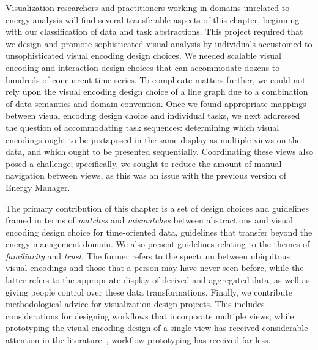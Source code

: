 Visualization researchers and practitioners working in domains unrelated to energy analysis will find several transferable aspects of this chapter, beginning with our classification of data and task abstractions.
This project required that we design and promote sophisticated visual analysis by individuals accustomed to unsophisticated visual encoding design choices.
We needed scalable visual encoding and interaction design choices that can accommodate dozens to hundreds of concurrent time series.
To complicate matters further, we could not rely upon the visual encoding design choice of a line graph due to a combination of data semantics and domain convention.
Once we found appropriate mappings between visual encoding design choice and individual tasks, we next addressed the question of accommodating task sequences: determining which visual encodings ought to be juxtaposed in the same display as multiple views on the data, and which ought to be presented sequentially.
Coordinating these views also posed a challenge; specifically, we sought to reduce the amount of manual navigation between views, as this was an issue with the previous version of Energy Manager.

The primary contribution of this chapter is a set of design choices and guidelines framed in terms of {\it matches} and {\it mismatches} between abstractions and visual encoding design choice for time-oriented data, guidelines that transfer beyond the energy management domain.
We also present guidelines relating to the themes of {\it familiarity} and {\it trust}.
The former refers to the spectrum between ubiquitous visual encodings and those that a person may have never seen before, while the latter refers to the appropriate display of derived and aggregated data, as well as giving people control over these data transformations.
Finally, we contribute methodological advice for visualization design projects.
This includes considerations for designing workflows that incorporate multiple views;
while prototyping the visual encoding design of a single view has received considerable attention in the literature~\cite{Lloyd2011}, workflow prototyping has received far less. 

